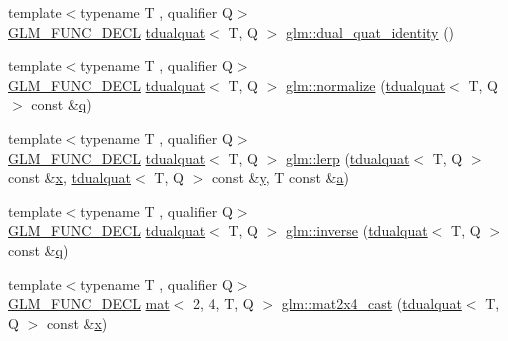 \begin{DoxyCompactItemize}
\item 
{\footnotesize template$<$typename T , qualifier Q$>$ }\\\mbox{\hyperlink{setup_8hpp_ab2d052de21a70539923e9bcbf6e83a51}{G\+L\+M\+\_\+\+F\+U\+N\+C\+\_\+\+D\+E\+CL}} \mbox{\hyperlink{structglm_1_1tdualquat}{tdualquat}}$<$ T, Q $>$ \mbox{\hyperlink{group__gtx__dual__quaternion_ga0b35c0e30df8a875dbaa751e0bd800e0}{glm\+::dual\+\_\+quat\+\_\+identity}} ()
\item 
{\footnotesize template$<$typename T , qualifier Q$>$ }\\\mbox{\hyperlink{setup_8hpp_ab2d052de21a70539923e9bcbf6e83a51}{G\+L\+M\+\_\+\+F\+U\+N\+C\+\_\+\+D\+E\+CL}} \mbox{\hyperlink{structglm_1_1tdualquat}{tdualquat}}$<$ T, Q $>$ \mbox{\hyperlink{group__gtx__dual__quaternion_ga299b8641509606b1958ffa104a162cfe}{glm\+::normalize}} (\mbox{\hyperlink{structglm_1_1tdualquat}{tdualquat}}$<$ T, Q $>$ const \&\mbox{\hyperlink{_s_d_l__opengl_8h_a8fc1e7b9baaae687804c7eed46ca09c6}{q}})
\item 
{\footnotesize template$<$typename T , qualifier Q$>$ }\\\mbox{\hyperlink{setup_8hpp_ab2d052de21a70539923e9bcbf6e83a51}{G\+L\+M\+\_\+\+F\+U\+N\+C\+\_\+\+D\+E\+CL}} \mbox{\hyperlink{structglm_1_1tdualquat}{tdualquat}}$<$ T, Q $>$ \mbox{\hyperlink{group__gtx__dual__quaternion_gace8380112d16d33f520839cb35a4d173}{glm\+::lerp}} (\mbox{\hyperlink{structglm_1_1tdualquat}{tdualquat}}$<$ T, Q $>$ const \&\mbox{\hyperlink{_s_d_l__opengl_8h_ad0e63d0edcdbd3d79554076bf309fd47}{x}}, \mbox{\hyperlink{structglm_1_1tdualquat}{tdualquat}}$<$ T, Q $>$ const \&\mbox{\hyperlink{_s_d_l__opengl_8h_a1675d9d7bb68e1657ff028643b4037e3}{y}}, T const \&\mbox{\hyperlink{_s_d_l__opengl__glext_8h_a3309789fc188587d666cda5ece79cf82}{a}})
\item 
{\footnotesize template$<$typename T , qualifier Q$>$ }\\\mbox{\hyperlink{setup_8hpp_ab2d052de21a70539923e9bcbf6e83a51}{G\+L\+M\+\_\+\+F\+U\+N\+C\+\_\+\+D\+E\+CL}} \mbox{\hyperlink{structglm_1_1tdualquat}{tdualquat}}$<$ T, Q $>$ \mbox{\hyperlink{group__gtx__dual__quaternion_ga070f521a953f6461af4ab4cf8ccbf27e}{glm\+::inverse}} (\mbox{\hyperlink{structglm_1_1tdualquat}{tdualquat}}$<$ T, Q $>$ const \&\mbox{\hyperlink{_s_d_l__opengl_8h_a8fc1e7b9baaae687804c7eed46ca09c6}{q}})
\item 
{\footnotesize template$<$typename T , qualifier Q$>$ }\\\mbox{\hyperlink{setup_8hpp_ab2d052de21a70539923e9bcbf6e83a51}{G\+L\+M\+\_\+\+F\+U\+N\+C\+\_\+\+D\+E\+CL}} \mbox{\hyperlink{structglm_1_1mat}{mat}}$<$ 2, 4, T, Q $>$ \mbox{\hyperlink{group__gtx__dual__quaternion_gae99d143b37f9cad4cd9285571aab685a}{glm\+::mat2x4\+\_\+cast}} (\mbox{\hyperlink{structglm_1_1tdualquat}{tdualquat}}$<$ T, Q $>$ const \&\mbox{\hyperlink{_s_d_l__opengl_8h_ad0e63d0edcdbd3d79554076bf309fd47}{x}})

\end{DoxyCompactItemize}
